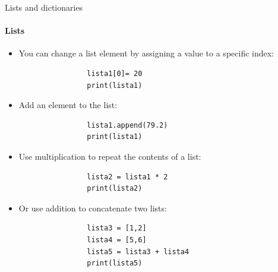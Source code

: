 \documentclass[notes,11pt, aspectratio=169, xcolor=table]{beamer}
\begin{document}
    \begin{frame}[fragile=singleslide]{Lists and dictionaries}
    \framesubtitle{Lists}
    
         \begin{itemize}
            \item You can change a list element by assigning a value to a specific index:

                \begin{verbatim}
                lista1[0]= 20 
                print(lista1)
                \end{verbatim}    

            \item Add an element to the list:

                \begin{verbatim}
                lista1.append(79.2) 
                print(lista1)
                \end{verbatim}    

            \item Use multiplication to repeat the contents of a list:

                \begin{verbatim}
                lista2 = lista1 * 2 
                print(lista2)
                \end{verbatim}    

            \item Or use addition to concatenate two lists:

                \begin{verbatim}
                lista3 = [1,2]
                lista4 = [5,6]
                lista5 = lista3 + lista4
                print(lista5)
                \end{verbatim}    

        \end{itemize}       

    \end{frame}
\end{document}
